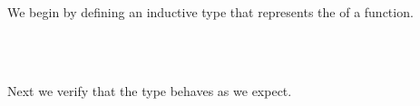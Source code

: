 \noindent We begin by defining an inductive type that represents the  of a function.
\ccpad
\begin{code}%
\>[1]\AgdaSpace{}%
\AgdaSpace{}%
\AgdaSymbol{(}\AgdaSpace{}%
\AgdaSymbol{:}\AgdaSpace{}%
\AgdaSpace{}%
\AgdaSpace{}%
\AgdaSymbol{)}\AgdaSpace{}%
\AgdaSymbol{:}\AgdaSpace{}%
\AgdaSpace{}%
\AgdaSpace{}%
\AgdaSpace{}%
\AgdaSpace{}%
\AgdaSpace{}%
\AgdaSpace{}%
\<%
\\
\>[1][@{}l@{\AgdaIndent{0}}]%
\>[2]\AgdaSpace{}%
\AgdaSymbol{:}\AgdaSpace{}%
\AgdaSymbol{(}\AgdaSpace{}%
\AgdaSymbol{:}\AgdaSpace{}%
\AgdaSymbol{)}\AgdaSpace{}%
\AgdaSpace{}%
\AgdaSpace{}%
\AgdaSpace{}%
\AgdaSpace{}%
\AgdaSpace{}%
\<%
\\
%
\>[2]\AgdaSpace{}%
\AgdaSymbol{:}\AgdaSpace{}%
\AgdaSymbol{(}\AgdaSpace{}%
\AgdaSymbol{:}\AgdaSpace{}%
\AgdaSymbol{)}\AgdaSpace{}%
\AgdaSpace{}%
\AgdaSymbol{(}\AgdaSpace{}%
\AgdaSymbol{:}\AgdaSpace{}%
\AgdaSymbol{)}\AgdaSpace{}%
\AgdaSpace{}%
\AgdaSpace{}%
\AgdaSpace{}%
\AgdaSpace{}%
\AgdaSpace{}%
\AgdaSpace{}%
\AgdaSpace{}%
\AgdaSpace{}%
\AgdaSpace{}%
\<%
\end{code}
\ccpad
Next we verify that the type behaves as we expect.
\ccpad
